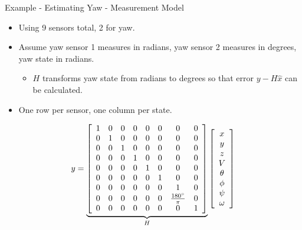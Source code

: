 \documentclass[hyperref={pdfpagelabels=false}]{beamer}
\begin{document}
\begin{frame}{Example - Estimating Yaw - Measurement Model}
\begin{itemize}
\item Using 9 sensors total, 2 for yaw.
\item Assume yaw sensor 1 measures in radians, yaw sensor 2 measures in degrees, yaw state in radians.
\begin{itemize}
\item $H$ transforms yaw state from radians to degrees so that error $y-H\hat{x}$ can be calculated.
\end{itemize}
\item One row per sensor, one column per state.
\end{itemize}
\begin{align*}
y = \underbrace{\left[\begin{array}{c c c c c c c c}
1 & 0 & 0 & 0 & 0 & 0 & 0 & 0 \\
0 & 1 & 0 & 0 & 0 & 0 & 0 & 0 \\
0 & 0 & 1 & 0 & 0 & 0 & 0 & 0 \\
0 & 0 & 0 & 1 & 0 & 0 & 0 & 0 \\
0 & 0 & 0 & 0 & 1 & 0 & 0 & 0 \\
0 & 0 & 0 & 0 & 0 & 1 & 0 & 0 \\
0 & 0 & 0 & 0 & 0 & 0 & 1 & 0 \\
0 & 0 & 0 & 0 & 0 & 0 & \frac{180^\circ}{\pi} & 0 \\
0 & 0 & 0 & 0 & 0 & 0 & 0 & 1
\end{array}\right]}_{H}
\left[\begin{array}{c}
x \\ y \\ z \\ V \\ \theta \\ \phi \\ \psi \\ \omega
\end{array}\right]
\end{align*}
\end{frame}
\end{document}
